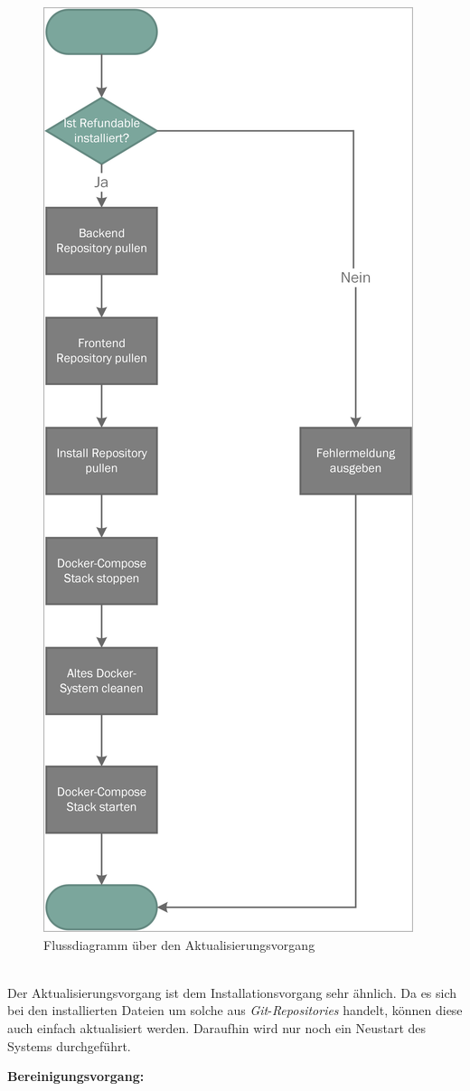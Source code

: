 \begin{figure}[H]
	\centering
	\includegraphics[width=0.47\linewidth]{images/mbeier_konzept/Update_border}
	\caption[Flussdiagramm über den Aktualisierungsvorgang]{Flussdiagramm über den Aktualisierungsvorgang}
	\label{fig:update}
\end{figure}
~\\
Der Aktualisierungsvorgang ist dem Installationsvorgang sehr ähnlich. Da es sich bei den installierten Dateien um solche aus \textit{Git}-\textit{Repositories} handelt, können diese auch einfach aktualisiert werden. Daraufhin wird nur noch ein Neustart des Systems durchgeführt.

\newpage

\textbf{Bereinigungsvorgang:}

